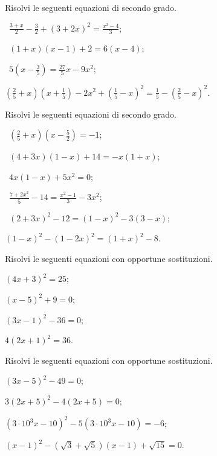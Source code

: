 \begin{esercizio}[\Ast]
\label{ese:3.31} %
Risolvi le seguenti equazioni di secondo grado.
 \begin{enumeratea}
 \item~$\frac{3+x}{2}-\frac{3}{2}+(3+2x)^{2} = \frac{x^{2}-4}{3}$;
 \item~$(1+x)(x-1)+2=6(x-4)$;
 \item~$5\left(x-\frac{3}{5}\right)=\frac{27}{5}x-9x^{2}$;
 \item $\left(\frac{2}{5}+x\right)\left(x+\frac{1}{5}\right)-2x^{2}+\left(\frac{1}{5}-x\right)^{2}=\frac{1}{5}-\left(\frac{2}{5}-x\right)^{2}$.
 \end{enumeratea}
\end{esercizio}
\pagebreak
\begin{esercizio}[\Ast]
\label{ese:3.32} %
Risolvi le seguenti equazioni di secondo grado.
\begin{multicols}{2}
 \begin{enumeratea}
 \item~$\left(\frac{2}{5}+x\right)\left(x-\frac{5}{2}\right)=-1$;
 \item~$(4+3x)(1-x)+14=-x(1+x)$;
 \item~$4x(1-x)+5x^{2}=0$;
 \item~$\frac{7+2x^{2}}{5}-14=\frac{x^{2}-1}{3}-3x^{2}$;
 \item~$(2+3x)^{2}-12=(1-x)^{2}-3(3-x)$;
 \item $(1-x)^{2}-(1-2x)^{2}=(1+x)^{2}-8$.
 \end{enumeratea}
\end{multicols}
\end{esercizio}

\begin{esercizio}[\Ast]
 \label{ese:3.33}
Risolvi le seguenti equazioni con opportune sostituzioni.
\begin{multicols}{2}
\begin{enumeratea}
\item $(4x + 3)^{2} = 25$;
\item $(x-5)^{2} + 9 = 0$;
\item $(3x-1)^{2}-36 = 0$;
\item $4 (2x + 1)^{2} = 36$.
\end{enumeratea}
\end{multicols}
\end{esercizio}

\begin{esercizio}[\Ast]
\label{ese:3.34}
Risolvi le seguenti equazioni con opportune sostituzioni.
\begin{multicols}{2}
\begin{enumeratea}
\item $(3x-5)^{2}-49 = 0$;
\item $3 (2x + 5)^{2}-4 (2x + 5) = 0$;
\item $(3 \cdot 10^{3} x-10)^{2}-5 (3 \cdot 10^{3} x-10) = -6$;
\item $(x-1)^{2}-(\sqrt{3} + \sqrt{5}) (x-1) + \sqrt{15} =0$.
\end{enumeratea}
\end{multicols}
\end{esercizio}

